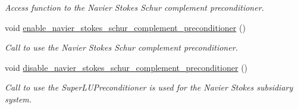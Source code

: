 \begin{DoxyCompactItemize}
\begin{DoxyCompactList}\small\item\em Access function to the Navier Stokes Schur complement preconditioner. \end{DoxyCompactList}\item 
void \hyperlink{classoomph_1_1PseudoElasticFSIPreconditioner_a136fa015ebb39a20e82682bacd65c65b}{enable\+\_\+navier\+\_\+stokes\+\_\+schur\+\_\+complement\+\_\+preconditioner} ()
\begin{DoxyCompactList}\small\item\em Call to use the Navier Stokes Schur complement preconditioner. \end{DoxyCompactList}\item 
void \hyperlink{classoomph_1_1PseudoElasticFSIPreconditioner_af2adaec06d407d4b89bca034984c66ba}{disable\+\_\+navier\+\_\+stokes\+\_\+schur\+\_\+complement\+\_\+preconditioner} ()
\begin{DoxyCompactList}\small\item\em Call to use the Super\+L\+U\+Preconditioner is used for the Navier Stokes subsidiary system. \end{DoxyCompactList}\end{DoxyCompactItemize}

